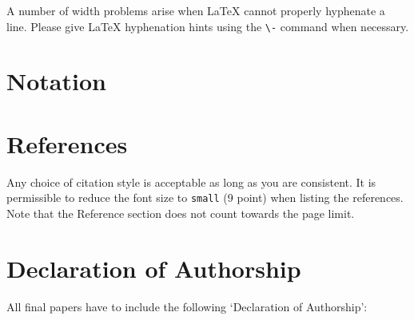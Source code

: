 \documentclass[a4paper]{article}
\begin{document}
A number of width problems arise when \LaTeX{} cannot properly hyphenate a
line. Please give LaTeX hyphenation hints using the \verb+\-+ command when
necessary.





\section{Notation}


\section*{References}

Any choice of citation style is acceptable as long as you are
consistent. It is permissible to reduce the font size to \verb+small+ (9 point)
when listing the references.
Note that the Reference section does not count towards the page limit.
\medskip







\section*{Declaration of Authorship}
All final papers have to include the following ‘Declaration of Authorship’:
\end{document}
